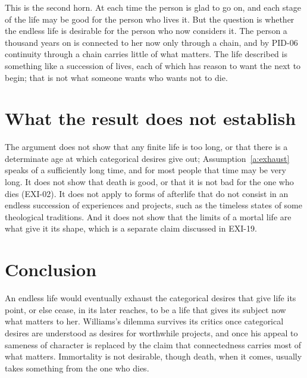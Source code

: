 \documentclass{situationist-preprint}
\begin{document}
\begin{reply}
This is the second horn. At each time the person is glad to go on, and each stage of the life may be good for the person who lives it. But the question is whether the endless life is desirable for the person who now considers it. The person a thousand years on is connected to her now only through a chain, and by PID-06 continuity through a chain carries little of what matters. The life described is something like a succession of lives, each of which has reason to want the next to begin; that is not what someone wants who wants not to die.
\end{reply}

\section{What the result does not establish}

The argument does not show that any finite life is too long, or that there is a determinate age at which categorical desires give out; Assumption~\ref{a:exhaust} speaks of a sufficiently long time, and for most people that time may be very long. It does not show that death is good, or that it is not bad for the one who dies (EXI-02). It does not apply to forms of afterlife that do not consist in an endless succession of experiences and projects, such as the timeless states of some theological traditions. And it does not show that the limits of a mortal life are what give it its shape, which is a separate claim discussed in EXI-19.

\section{Conclusion}

An endless life would eventually exhaust the categorical desires that give life its point, or else cease, in its later reaches, to be a life that gives its subject now what matters to her. Williams's dilemma survives its critics once categorical desires are understood as desires for worthwhile projects, and once his appeal to sameness of character is replaced by the claim that connectedness carries most of what matters. Immortality is not desirable, though death, when it comes, usually takes something from the one who dies.
\end{document}
